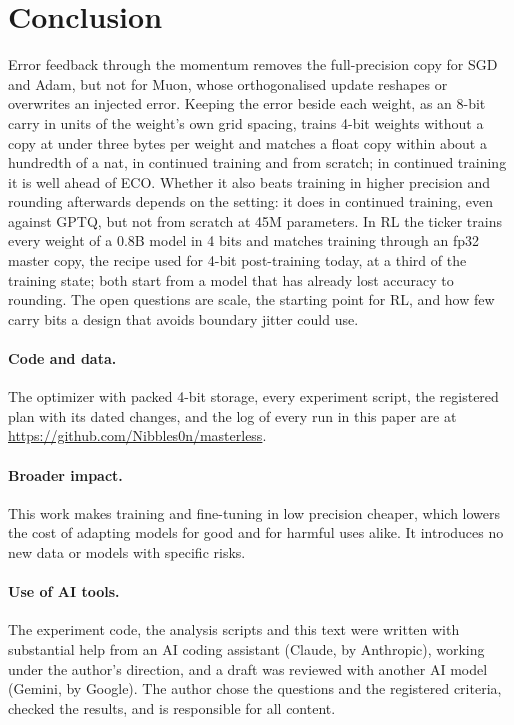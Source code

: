 \documentclass[11pt]{article}
\begin{document}
\section{Conclusion}\label{sec:conclusion}
Error feedback through the momentum removes the full-precision copy for SGD and Adam, but not for Muon, whose
orthogonalised update reshapes or overwrites an injected error. Keeping the error beside each weight, as an 8-bit
carry in units of the weight's own grid spacing, trains 4-bit weights without a copy at under three bytes per weight
and matches a float copy within about a hundredth of a nat, in continued training and from scratch; in continued
training it is well ahead of ECO.
Whether it also beats training in higher precision and rounding afterwards depends on the setting: it does in
continued training, even against GPTQ, but not from scratch at 45M parameters. In RL the ticker trains every weight of
a 0.8B model in 4 bits and matches training through an fp32 master copy, the recipe used for 4-bit post-training today,
at a third of the training state; both start from a model that has already lost accuracy to rounding. The open questions are scale, the starting point for RL, and how few carry bits a design that
avoids boundary jitter could use.

\paragraph{Code and data.} The optimizer with packed 4-bit storage, every experiment script, the registered plan with
its dated changes, and the log of every run in this paper are at \url{https://github.com/Nibbles0n/masterless}.

\paragraph{Broader impact.} This work makes training and fine-tuning in low precision cheaper, which lowers the cost
of adapting models for good and for harmful uses alike. It introduces no new data or models with specific risks.

\paragraph{Use of AI tools.} The experiment code, the analysis scripts and this text were written with substantial
help from an AI coding assistant (Claude, by Anthropic), working under the author's direction, and a draft was
reviewed with another AI model (Gemini, by Google). The author chose the questions and the registered criteria,
checked the results, and is responsible for all content.
\end{document}
